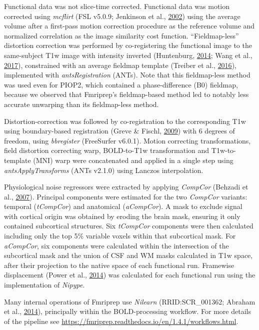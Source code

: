 \documentclass[11pt,american,a4paper,oneside,]{memoir} %
\begin{document}
Functional data was not slice-time corrected. Functional data was motion corrected using \emph{mcflirt} (FSL v5.0.9; Jenkinson et al., \protect\hyperlink{ref-Jenkinson2002-wm}{2002}) using the average volume after a first-pass motion correction procedure as the reference volume and normalized correlation as the image similarity cost function. ``Fieldmap-less'' distortion correction was performed by co-registering the functional image to the same-subject T1w image with intensity inverted (Huntenburg, \protect\hyperlink{ref-Huntenburg2014-ps}{2014}; Wang et al., \protect\hyperlink{ref-Wang2017-nk}{2017}), constrained with an average fieldmap template (Treiber et al., \protect\hyperlink{ref-Treiber2016-mc}{2016}), implemented with \emph{antsRegistration} (ANTs). Note that this fieldmap-less method was used even for PIOP2, which contained a phase-difference (B0) fieldmap, because we observed that Fmriprep's fieldmap-based method led to notably less accurate unwarping than its fieldmap-less method.

Distortion-correction was followed by co-registration to the corresponding T1w using boundary-based registration (Greve \& Fischl, \protect\hyperlink{ref-Greve2009-da}{2009}) with 6 degrees of freedom, using \emph{bbregister} (FreeSurfer v6.0.1). Motion correcting transformations, field distortion correcting warp, BOLD-to-T1w transformation and T1w-to-template (MNI) warp were concatenated and applied in a single step using \emph{antsApplyTransforms} (ANTs v2.1.0) using Lanczos interpolation.

Physiological noise regressors were extracted by applying \emph{CompCor} (Behzadi et al., \protect\hyperlink{ref-Behzadi2007-eb}{2007}). Principal components were estimated for the two \emph{CompCor} variants: temporal (\emph{tCompCor}) and anatomical (\emph{aCompCor}). A mask to exclude signal with cortical origin was obtained by eroding the brain mask, ensuring it only contained subcortical structures. Six \emph{tCompCor} components were then calculated including only the top 5\% variable voxels within that subcortical mask. For \emph{aCompCor}, six components were calculated within the intersection of the subcortical mask and the union of CSF and WM masks calculated in T1w space, after their projection to the native space of each functional run. Framewise displacement (Power et al., \protect\hyperlink{ref-Power2014-gh}{2014}) was calculated for each functional run using the implementation of \emph{Nipype}.

Many internal operations of Fmriprep use \emph{Nilearn} (RRID:SCR\_001362; Abraham et al., \protect\hyperlink{ref-Abraham2014-ef}{2014}), principally within the BOLD-processing workflow. For more details of the pipeline see
\url{https://fmriprep.readthedocs.io/en/1.4.1/workflows.html}.
\end{document}
